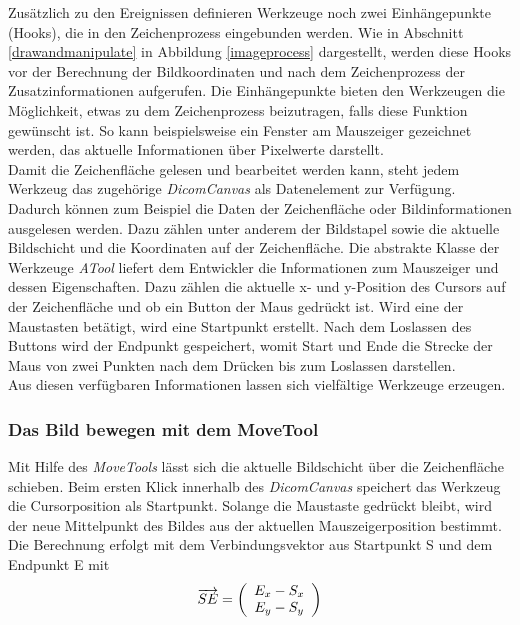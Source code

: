 Zusätzlich zu den Ereignissen definieren Werkzeuge noch zwei Einhängepunkte (Hooks), die in den Zeichenprozess eingebunden werden. Wie in Abschnitt \ref{drawandmanipulate} in Abbildung \ref{imageprocess} dargestellt, werden diese Hooks vor der Berechnung der Bildkoordinaten und nach dem Zeichenprozess der Zusatzinformationen aufgerufen. Die Einhängepunkte bieten den Werkzeugen die Möglichkeit, etwas zu dem Zeichenprozess beizutragen, falls diese Funktion gewünscht ist. So kann beispielsweise ein Fenster am Mauszeiger gezeichnet werden, das aktuelle Informationen über Pixelwerte darstellt.\\
Damit die Zeichenfläche gelesen und bearbeitet werden kann, steht jedem Werkzeug das zugehörige \textit{DicomCanvas} als Datenelement zur Verfügung. Dadurch können zum Beispiel die Daten der Zeichenfläche oder Bildinformationen ausgelesen werden. Dazu zählen unter anderem der Bildstapel sowie die aktuelle Bildschicht und die Koordinaten auf der Zeichenfläche. Die abstrakte Klasse der Werkzeuge \textit{ATool} liefert dem Entwickler die Informationen zum Mauszeiger und dessen Eigenschaften. Dazu zählen die aktuelle x- und y-Position des Cursors auf der Zeichenfläche und ob ein Button der Maus gedrückt ist. Wird eine der Maustasten betätigt, wird eine Startpunkt erstellt. Nach dem Loslassen des Buttons wird der Endpunkt gespeichert, womit Start und Ende die Strecke der Maus von zwei Punkten nach dem Drücken bis zum Loslassen darstellen.\\
Aus diesen verfügbaren Informationen lassen sich vielfältige Werkzeuge erzeugen. 

\subsubsection{Das Bild bewegen mit dem MoveTool}
Mit Hilfe des \textit{MoveTools} lässt sich die aktuelle Bildschicht über die Zeichenfläche schieben. Beim ersten Klick innerhalb des \textit{DicomCanvas} speichert das Werkzeug die Cursorposition als Startpunkt. Solange die Maustaste gedrückt bleibt, wird der neue Mittelpunkt des Bildes aus der aktuellen Mauszeigerposition bestimmt. Die Berechnung erfolgt mit dem Verbindungsvektor aus Startpunkt S und dem Endpunkt E mit 
\begin{equation}
\overrightarrow{SE}=\left(\begin{array}{c} E_x - S_x \\ E_y  - S_y\\ \end{array}\right)
\vspace{0.5cm}
\end{equation}

